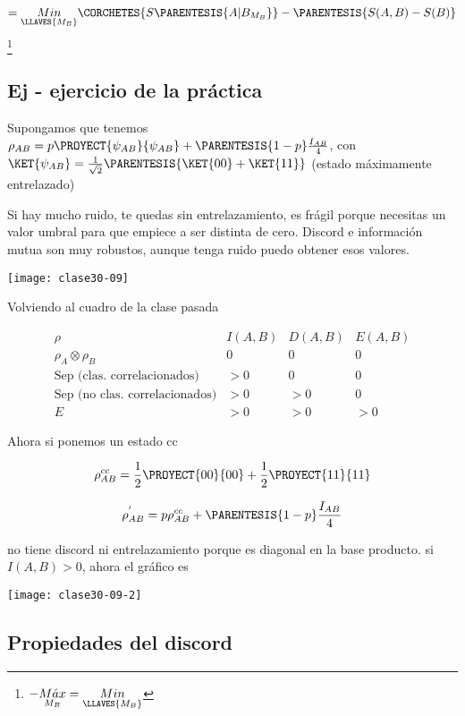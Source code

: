 \[
=\underset{\LLAVES{M_{B}}}{Min}\CORCHETES{S\PARENTESIS{A|B_{M_{B}}}}-\PARENTESIS{S(A,B)-S(B)}
\]
\footnote{$-\text{\ensuremath{\underset{M_{B}}{M\acute{a}x}}}=\underset{\LLAVES{M_{B}}}{Min}$}

\subsection{Ej - ejercicio de la práctica}

Supongamos que tenemos $\rho_{AB}=p\PROYECT{\psi_{AB}}{\psi_{AB}}+\PARENTESIS{1-p}\frac{I_{AB}}{4}$,
con $\KET{\psi_{AB}}=\frac{1}{\sqrt{2}}\PARENTESIS{\KET{00}+\KET{11}}$
(estado máximamente entrelazado)

Si hay mucho ruido, te quedas sin entrelazamiento, es frágil porque
necesitas un valor umbral para que empiece a ser distinta de cero.
Discord e información mutua son muy robustos, aunque tenga ruido puedo
obtener esos valores. 
\begin{center}
\texttt{[image: clase30-09]}
\par\end{center}

Volviendo al cuadro de la clase pasada

\[
\begin{array}{c|c|c|c}
\rho & I(A,B) & D(A,B) & E(A,B)\\
\rho_{A}\otimes\rho_{B} & 0 & 0 & 0\\
\text{Sep (clas. correlacionados)} & >0 & 0 & 0\\
\text{Sep (no clas. correlacionados)} & >0 & >0 & 0\\
E & >0 & >0 & >0
\end{array}
\]

Ahora si ponemos un estado cc

\[
\rho_{AB}^{cc}=\frac{1}{2}\PROYECT{00}{00}+\frac{1}{2}\PROYECT{11}{11}
\]

\[
\rho_{AB}^{'}=p\rho_{AB}^{cc}+\PARENTESIS{1-p}\frac{I_{AB}}{4}
\]

no tiene discord ni entrelazamiento porque es diagonal en la base
producto. si $I(A,B)>0$, ahora el gráfico es
\begin{center}
\texttt{[image: clase30-09-2]}
\par\end{center}

\subsection{Propiedades del discord}

